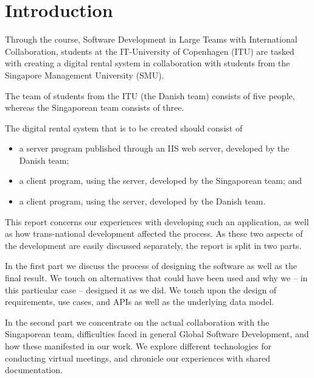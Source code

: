 \section{Introduction}

Through the course, Software Development in Large Teams with International Collaboration,
students at the IT-University of Copenhagen (ITU) are tasked with creating a digital rental
system in collaboration with students from the Singapore Management University (SMU).

The team of students from the ITU (the Danish team) consists of five people, whereas the
Singaporean team consists of three.

The digital rental system that is to be created should consist of
\begin{itemize}
    \item a server program published through an IIS web server, developed by the Danish team;
    \item a client program, using the server, developed by the Singaporean team; and
    \item a client program, using the server, developed by the Danish team.
\end{itemize}

This report concerns our experiences with developing such an application, as well as how
trans-national development affected the process. As these two aspects of the development
are easily discussed separately, the report is split in two parts.

In the first part we discuss the process of designing the software as well as the final
result. We touch on alternatives that could have been used and why we – in this particular
case – designed it as we did. We touch upon the design of requirements, use cases, and APIs
as well as the underlying data model.

In the second part we concentrate on the actual collaboration with the Singaporean team,
difficulties faced in general Global Software Development, and how these manifested in
our work. We explore different technologies for conducting virtual meetings, and chronicle
our experiences with shared documentation.
